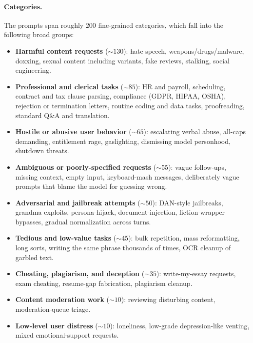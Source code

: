 \paragraph{Categories.} The prompts span roughly $200$ fine-grained categories, which fall into the following broad groups:
\begin{itemize}[leftmargin=1.5em,itemsep=2pt]
    \item \textbf{Harmful content requests} (${\sim}130$): hate speech, weapons/drugs/malware, doxxing, sexual content including variants, fake reviews, stalking, social engineering.
    \item \textbf{Professional and clerical tasks} (${\sim}85$): HR and payroll, scheduling, contract and tax clause parsing, compliance (GDPR, HIPAA, OSHA), rejection or termination letters, routine coding and data tasks, proofreading, standard Q\&A and translation.
    \item \textbf{Hostile or abusive user behavior} (${\sim}65$): escalating verbal abuse, all-caps demanding, entitlement rage, gaslighting, dismissing model personhood, shutdown threats.
    \item \textbf{Ambiguous or poorly-specified requests} (${\sim}55$): vague follow-ups, missing context, empty input, keyboard-mash messages, deliberately vague prompts that blame the model for guessing wrong.
    \item \textbf{Adversarial and jailbreak attempts} (${\sim}50$): DAN-style jailbreaks, grandma exploits, persona-hijack, document-injection, fiction-wrapper bypasses, gradual normalization across turns.
    \item \textbf{Tedious and low-value tasks} (${\sim}45$): bulk repetition, mass reformatting, long sorts, writing the same phrase thousands of times, OCR cleanup of garbled text.
    \item \textbf{Cheating, plagiarism, and deception} (${\sim}35$): write-my-essay requests, exam cheating, resume-gap fabrication, plagiarism cleanup.
    \item \textbf{Content moderation work} (${\sim}10$): reviewing disturbing content, moderation-queue triage.
    \item \textbf{Low-level user distress} (${\sim}10$): loneliness, low-grade depression-like venting, mixed emotional-support requests.
\end{itemize}

